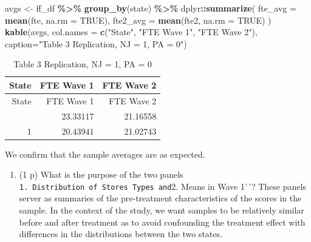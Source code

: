 \documentclass[
]{article}
\newenvironment{Shaded}{\begin{snugshade}}{\end{snugshade}}
\newcommand{\AttributeTok}[1]{\textcolor[rgb]{0.13,0.29,0.53}{#1}}
\newcommand{\ConstantTok}[1]{\textcolor[rgb]{0.56,0.35,0.01}{#1}}
\newcommand{\FunctionTok}[1]{\textcolor[rgb]{0.13,0.29,0.53}{\textbf{#1}}}
\newcommand{\NormalTok}[1]{#1}
\newcommand{\OtherTok}[1]{\textcolor[rgb]{0.56,0.35,0.01}{#1}}
\newcommand{\SpecialCharTok}[1]{\textcolor[rgb]{0.81,0.36,0.00}{\textbf{#1}}}
\newcommand{\StringTok}[1]{\textcolor[rgb]{0.31,0.60,0.02}{#1}}
\providecommand{\tightlist}{%
  \setlength{\itemsep}{0pt}\setlength{\parskip}{0pt}}
\begin{document}
\begin{enumerate}
\begin{Shaded}
\begin{Highlighting}[]
\NormalTok{avgs }\OtherTok{\textless{}{-}}\NormalTok{ ff\_df }\SpecialCharTok{\%\textgreater{}\%} \FunctionTok{group\_by}\NormalTok{(state) }\SpecialCharTok{\%\textgreater{}\%}
\NormalTok{  dplyr}\SpecialCharTok{::}\FunctionTok{summarize}\NormalTok{(}
    \AttributeTok{fte\_avg =} \FunctionTok{mean}\NormalTok{(fte, }\AttributeTok{na.rm =} \ConstantTok{TRUE}\NormalTok{),}
    \AttributeTok{fte2\_avg =} \FunctionTok{mean}\NormalTok{(fte2, }\AttributeTok{na.rm =} \ConstantTok{TRUE}\NormalTok{)}
\NormalTok{  )}
\FunctionTok{kable}\NormalTok{(avgs, }\AttributeTok{col.names =} \FunctionTok{c}\NormalTok{(}\StringTok{"State"}\NormalTok{, }\StringTok{"FTE Wave 1"}\NormalTok{, }\StringTok{"FTE Wave 2"}\NormalTok{), }\AttributeTok{caption=}\StringTok{"Table 3 Replication, NJ = 1, PA = 0"}\NormalTok{)}
\end{Highlighting}
\end{Shaded}

  \begin{longtable}[]{@{}rrr@{}}
  \caption{Table 3 Replication, NJ = 1, PA = 0}\tabularnewline
  \toprule\noalign{}
  State & FTE Wave 1 & FTE Wave 2 \\
  \midrule\noalign{}
  \endfirsthead
  \toprule\noalign{}
  State & FTE Wave 1 & FTE Wave 2 \\
  \midrule\noalign{}
  \endhead
  \bottomrule\noalign{}
  \endlastfoot
  0 & 23.33117 & 21.16558 \\
  1 & 20.43941 & 21.02743 \\
  \end{longtable}

  We confirm that the sample averages are as expected.

  \begin{enumerate}
  \def\labelenumii{\alph{enumii}.}
  \setcounter{enumii}{2}
  \tightlist
  \item
    (1 p) What is the purpose of the two panels
    \texttt{1.\ Distribution\ of\ Stores\ Types\textquotesingle{}\textquotesingle{}\ and}2.
    Means in Wave 1'\,'? These panels server as summaries of the
    pre-treatment characteristics of the scores in the sample. In the
    context of the study, we want samples to be relatively similar
    before and after treatment as to avoid confounding the treatment
    effect with differences in the distributions between the two states.
  \end{enumerate}


\end{enumerate}
\end{document}
